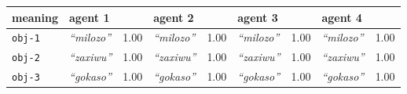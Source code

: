
{\renewcommand{\arraystretch}{1.5}
\begin{tabular}{@{}p{1.2cm}|p{1.6cm}@{}p{0.8cm}@{}|p{1.6cm}@{}p{0.8cm}@{}|p{1.6cm}@{}p{0.8cm}@{}|p{1.6cm}@{}p{0.8cm}@{}}
meaning & agent 1 &  & agent 2 &  & agent 3 &  & agent 4 & \\
\hline
\texttt{obj-1}&\textit{``milozo''}
&1.00&\textit{``milozo''}
&1.00&\textit{``milozo''}
&1.00&\textit{``milozo''}
&1.00\\
\hline
\texttt{obj-2}&\textit{``zaxiwu''}
&1.00&\textit{``zaxiwu''}
&1.00&\textit{``zaxiwu''}
&1.00&\textit{``zaxiwu''}
&1.00\\
\hline
\texttt{obj-3}&\textit{``gokaso''}
&1.00&\textit{``gokaso''}
&1.00&\textit{``gokaso''}
&1.00&\textit{``gokaso''}
&1.00
\end{tabular}}
